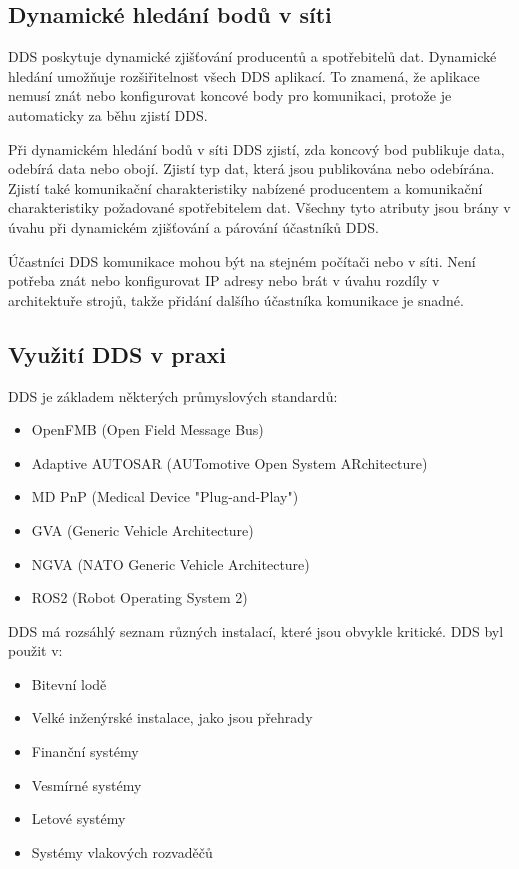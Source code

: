 \subsection{Dynamické hledání bodů v síti}

\acs{DDS} poskytuje dynamické zjišťování producentů a spotřebitelů dat. Dynamické hledání umožňuje rozšiřitelnost všech \acs{DDS} aplikací. To znamená, že aplikace nemusí znát nebo konfigurovat koncové body pro komunikaci, protože je automaticky za běhu zjistí \acs{DDS}.

Při dynamickém hledání bodů v síti \acs{DDS} zjistí, zda koncový bod publikuje data, odebírá data nebo obojí. Zjistí typ dat, která jsou publikována nebo odebírána. Zjistí také komunikační charakteristiky nabízené producentem a komunikační charakteristiky požadované spotřebitelem dat. Všechny tyto atributy jsou brány v úvahu při dynamickém zjišťování a párování účastníků \acs{DDS}. \cite{DDS_Main}

Účastníci \acs{DDS} komunikace mohou být na stejném počítači nebo v síti. Není potřeba znát nebo konfigurovat IP adresy nebo brát v úvahu rozdíly v architektuře strojů, takže přidání dalšího účastníka komunikace je snadné.

\subsection{Využití \acs{DDS} v praxi}

\acl{DDS} je základem některých průmyslových standardů: \cite{DDS_usage}

\begin{itemize}
    \item OpenFMB (Open Field Message Bus)
    \item Adaptive AUTOSAR (AUTomotive Open System ARchitecture)
    \item MD PnP (Medical Device "Plug-and-Play")
    \item GVA (Generic Vehicle Architecture)
    \item NGVA (NATO Generic Vehicle Architecture)
    \item ROS2 (Robot Operating System 2) \\[0.2cm]
\end{itemize}

\acs{DDS} má rozsáhlý seznam různých instalací, které jsou obvykle kritické. \acs{DDS} byl použit v: \cite{ROS2DDS}

\begin{itemize}
    \item Bitevní lodě
    \item Velké inženýrské instalace, jako jsou přehrady
    \item Finanční systémy
    \item Vesmírné systémy
    \item Letové systémy
    \item Systémy vlakových rozvaděčů
\end{itemize}